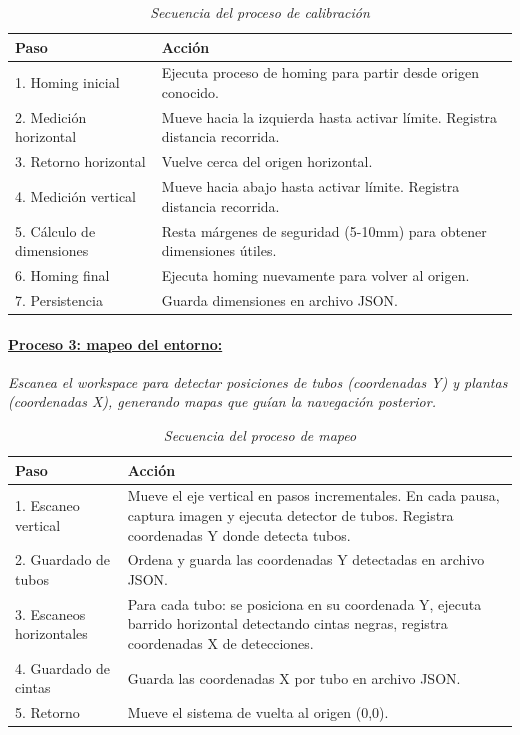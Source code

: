 \begin{table}[H]
\centering
\small
\begin{tabular}{|l|p{10cm}|}
\hline
Paso & Acción \\
\hline
1. Homing inicial & Ejecuta proceso de homing para partir desde origen conocido. \\
\hline
2. Medición horizontal & Mueve hacia la izquierda hasta activar límite. Registra distancia recorrida. \\
\hline
3. Retorno horizontal & Vuelve cerca del origen horizontal. \\
\hline
4. Medición vertical & Mueve hacia abajo hasta activar límite. Registra distancia recorrida. \\
\hline
5. Cálculo de dimensiones & Resta márgenes de seguridad (5-10mm) para obtener dimensiones útiles. \\
\hline
6. Homing final & Ejecuta homing nuevamente para volver al origen. \\
\hline
7. Persistencia & Guarda dimensiones en archivo JSON. \\
\hline
\end{tabular}
\caption{\textit{Secuencia del proceso de calibración}}
\label{tab:proceso_calibracion}
\end{table}

\paragraph{\underline{Proceso 3: mapeo del entorno:}}

\textit{Escanea el workspace para detectar posiciones de tubos (coordenadas Y) y plantas (coordenadas X), generando mapas que guían la navegación posterior.}

\begin{table}[H]
\centering
\small
\begin{tabular}{|l|p{10cm}|}
\hline
Paso & Acción \\
\hline
1. Escaneo vertical & Mueve el eje vertical en pasos incrementales. En cada pausa, captura imagen y ejecuta detector de tubos. Registra coordenadas Y donde detecta tubos. \\
\hline
2. Guardado de tubos & Ordena y guarda las coordenadas Y detectadas en archivo JSON. \\
\hline
3. Escaneos horizontales & Para cada tubo: se posiciona en su coordenada Y, ejecuta barrido horizontal detectando cintas negras, registra coordenadas X de detecciones. \\
\hline
4. Guardado de cintas & Guarda las coordenadas X por tubo en archivo JSON. \\
\hline
5. Retorno & Mueve el sistema de vuelta al origen (0,0). \\
\hline
\end{tabular}
\caption{\textit{Secuencia del proceso de mapeo}}
\label{tab:proceso_mapeo}
\end{table}

